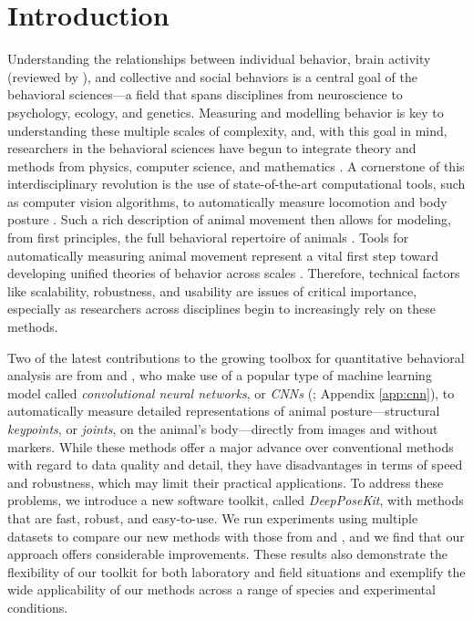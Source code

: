 \documentclass[11pt,a4paper,oneside]{book}
\begin{document}
\section{Introduction}
Understanding the relationships between individual behavior, brain activity (reviewed by \citealt{krakauer2017neuroscience}), and collective and social behaviors \citep{rosenthal2015revealing,strandburg2013visual, jolles2017consistent, klibaite2017unsupervised, klibaite2019interacting} is a central goal of the behavioral sciences—a field that spans disciplines from neuroscience to psychology, ecology, and genetics. Measuring and modelling behavior is key to understanding these multiple scales of complexity, and, with this goal in mind, researchers in the behavioral sciences have begun to integrate theory and methods from physics, computer science, and mathematics \citep{anderson2014toward, berman2018measuring, brown2018ethology}. A cornerstone of this interdisciplinary revolution is the use of state-of-the-art computational tools, such as computer vision algorithms, to automatically measure locomotion and body posture \citep{dell2014automated}. Such a rich description of animal movement then allows for modeling, from first principles, the full behavioral repertoire of animals \citep{stephens2011emergence, berman2014mapping, berman2016predictability, wiltschko2015mapping, johnson2016composing, todd2017systematic, klibaite2017unsupervised, markowitz2018striatum, klibaite2019interacting,Costa1501}. Tools for automatically measuring animal movement represent a vital first step toward developing unified theories of behavior across scales \citep{berman2018measuring, brown2018ethology}. Therefore, technical factors like scalability, robustness, and usability are issues of critical importance, especially as researchers across disciplines begin to increasingly rely on these methods.


Two of the latest contributions to the growing toolbox for quantitative behavioral analysis are from \cite{mathis2018deeplabcut} and \cite{pereira2019fast}, who make use of a popular type of machine learning model called \textit{convolutional neural networks}, or \textit{CNNs} (\citealt{lecun2015deep}; Appendix \ref{app:cnn}), to automatically measure detailed representations of animal posture—structural \textit{keypoints}, or \textit{joints}, on the animal's body—directly from images and without markers. While these methods offer a major advance over conventional methods with regard to data quality and detail, they have disadvantages in terms of speed and robustness, which may limit their practical applications. 
To address these problems, we introduce a new software toolkit, called \textit{DeepPoseKit}, with methods that are fast, robust, and easy-to-use. We run experiments using multiple datasets to compare our new methods with those from \cite{mathis2018deeplabcut} and \cite{pereira2019fast}, and we find that our approach offers considerable improvements. These results also demonstrate the flexibility of our toolkit for both laboratory and field situations and exemplify the wide applicability of our methods across a range of species and experimental conditions.
\end{document}
